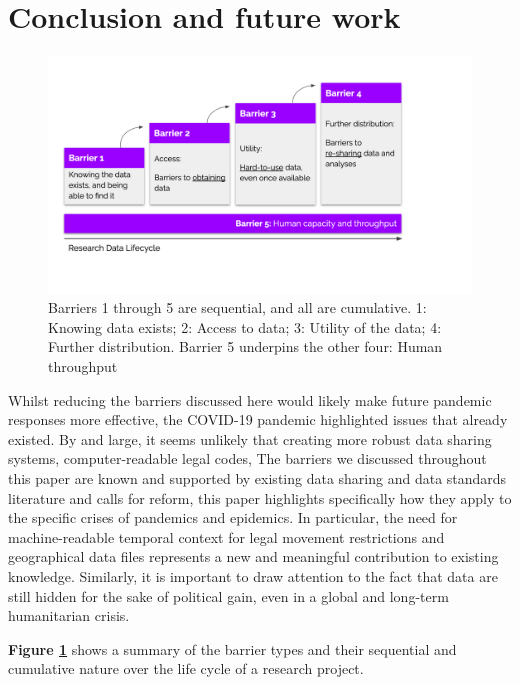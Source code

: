 \documentclass{CUP-JNL-DAP}%
\begin{document}
\section{Conclusion and future work}

\begin{figure}[!ht]
    \centering
    \includegraphics[width=1\linewidth]{figures/figure-barriers.png}
    \caption{Barriers 1 through 5 are sequential, and all are cumulative. 1: Knowing data exists; 2: Access to data; 3: Utility of the data; 4: Further distribution. Barrier 5 underpins the other four: Human throughput}
    \label{fig:fig-barriers}
\end{figure}

Whilst reducing the barriers discussed here would likely make future pandemic responses more effective, the COVID-19 pandemic highlighted issues that already existed. By and large, it seems unlikely that creating more robust data sharing systems, computer-readable legal codes, 
The barriers we discussed throughout this paper are known and supported by existing data sharing and data standards literature and calls for reform, this paper highlights specifically how they apply to the specific crises of pandemics and epidemics. In particular, the need for machine-readable temporal context for legal movement restrictions and geographical data files represents a new and meaningful contribution to existing knowledge. Similarly, it is important to draw attention to the fact that data are still hidden for the sake of political gain, even in a global and long-term humanitarian crisis. 

\textbf{Figure \ref{fig:fig-barriers} }shows a summary of the barrier types and their sequential and cumulative nature over the life cycle of a research project. 
\end{document}

